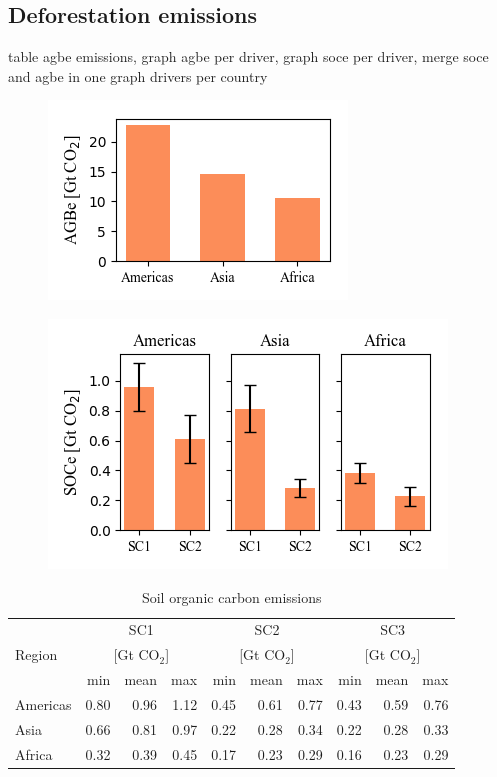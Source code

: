 \clearpage

    \subsection{Deforestation emissions}
		{\color{red} table agbe emissions, graph agbe per driver, graph soce per driver, merge soce and agbe in one graph}
		{\color{red} drivers per country}

	    \begin{figure}[ht]
		    \centering
			\includegraphics[scale=1]{img/agbe}
			\caption[Ecosystem service values]{}
			\label{fig:agbe}
	    \end{figure}
	    \begin{figure}[ht]
		    \centering
		    \includegraphics[scale=1]{img/soce}
		    \caption[Ecosystem service values]{}
		    \label{fig:soce}
	    \end{figure}


	    \begin{table}[ht]
		    \centering
		    \caption[Soil organic carbon emissions]{Soil organic carbon emissions}
		    \label{tab:soce_tab}
		    \begin{tabular}{lrrrrrrrrr}
			    \hline
			    \multirow{3}{*}{Region} & \multicolumn{3}{c}{SC1}& \multicolumn{3}{c}{SC2} & \multicolumn{3}{c}{SC3} \\
			    & \multicolumn{3}{c}{[Gt CO$_2$]}& \multicolumn{3}{c}{[Gt CO$_2$]} & \multicolumn{3}{c}{[Gt CO$_2$]} \\
			    & min & mean & max & min & mean & max & min & mean & max \\\hline
			    Americas & 0.80 & 0.96 & 1.12 & 0.45 & 0.61 & 0.77 & 0.43 & 0.59 & 0.76 \\
			    Asia & 0.66 & 0.81 & 0.97 & 0.22 & 0.28 & 0.34 & 0.22 & 0.28 & 0.33 \\
			    Africa & 0.32 & 0.39 & 0.45 & 0.17 & 0.23 & 0.29 & 0.16 & 0.23 & 0.29 \\\hline
		    \end{tabular}
	    \end{table}

